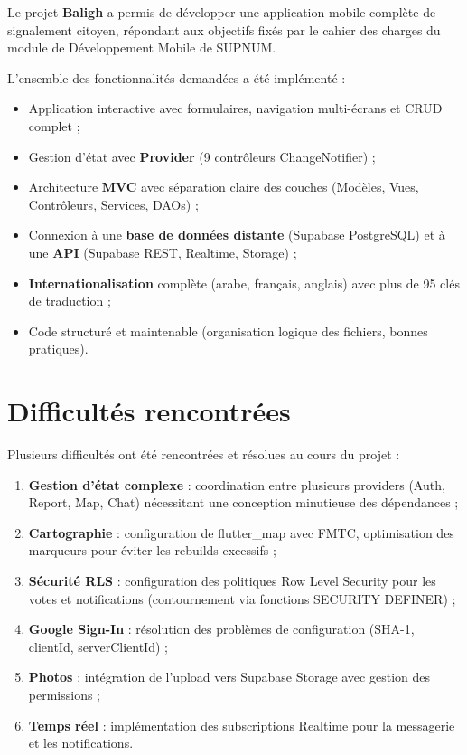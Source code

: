 \documentclass[12pt,a4paper]{report}
\begin{document}
Le projet \textbf{Baligh} a permis de développer une application mobile complète de signalement citoyen, répondant aux objectifs fixés par le cahier des charges du module de Développement Mobile de SUPNUM.

L'ensemble des fonctionnalités demandées a été implémenté :
\begin{itemize}
    \item Application interactive avec formulaires, navigation multi-écrans et CRUD complet ;
    \item Gestion d'état avec \textbf{Provider} (9 contrôleurs ChangeNotifier) ;
    \item Architecture \textbf{MVC} avec séparation claire des couches (Modèles, Vues, Contrôleurs, Services, DAOs) ;
    \item Connexion à une \textbf{base de données distante} (Supabase PostgreSQL) et à une \textbf{API} (Supabase REST, Realtime, Storage) ;
    \item \textbf{Internationalisation} complète (arabe, français, anglais) avec plus de 95 clés de traduction ;
    \item Code structuré et maintenable (organisation logique des fichiers, bonnes pratiques).
\end{itemize}

\section{Difficultés rencontrées}

Plusieurs difficultés ont été rencontrées et résolues au cours du projet :

\begin{enumerate}
    \item \textbf{Gestion d'état complexe} : coordination entre plusieurs providers (Auth, Report, Map, Chat) nécessitant une conception minutieuse des dépendances ;
    \item \textbf{Cartographie} : configuration de flutter\_map avec FMTC, optimisation des marqueurs pour éviter les rebuilds excessifs ;
    \item \textbf{Sécurité RLS} : configuration des politiques Row Level Security pour les votes et notifications (contournement via fonctions SECURITY DEFINER) ;
    \item \textbf{Google Sign-In} : résolution des problèmes de configuration (SHA-1, clientId, serverClientId) ;
    \item \textbf{Photos} : intégration de l'upload vers Supabase Storage avec gestion des permissions ;
    \item \textbf{Temps réel} : implémentation des subscriptions Realtime pour la messagerie et les notifications.
\end{enumerate}
\end{document}
